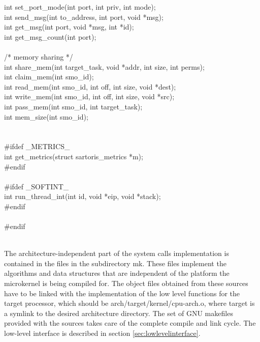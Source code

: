 \documentclass[11pt, letterpaper, twoside, english]{book}
\begin{document}
\begin{sf}
int set\_port\_mode(int port, int priv, int mode);\\
int send\_msg(int to\_address, int port, void *msg); \\
int get\_msg(int port, void *msg, int *id); \\
int get\_msg\_count(int port); \\
\\
/* memory sharing */ \\
int share\_mem(int target\_task, void *addr, int size, int perms); \\
int claim\_mem(int smo\_id); \\
int read\_mem(int smo\_id, int off, int size, void *dest); \\
int write\_mem(int smo\_id, int off, int size, void *src); \\ 
int pass\_mem(int smo\_id, int target\_task); \\
int mem\_size(int smo\_id); \\
\\
\\
\#ifdef \_METRICS\_\\
int get\_metrics(struct sartoris\_metrics *m);\\
\#endif\\
\\
\#ifdef \_SOFTINT\_\\
int run\_thread\_int(int id, void *eip, void *stack);\\
\#endif\\
\\
\#endif \\ \\
\end{sf}
The architecture-independent part of the system calls implementation is contained in the files in the subdirectory \textsf{mk}. These files implement the algorithms and data structures that are independent of the platform the microkernel is being compiled for. The object files obtained from these sources have to be linked with the implementation of the low level functions for the target processor, which should be \textsf{arch/target/kernel/cpu-arch.o}, where \textsf{target} is a symlink to the desired architecture directory. The set of GNU makefiles provided with the sources takes care of the complete compile and link cycle.  The low-level interface is described in section \ref{sec:lowlevelinterface}. 
\end{document}
